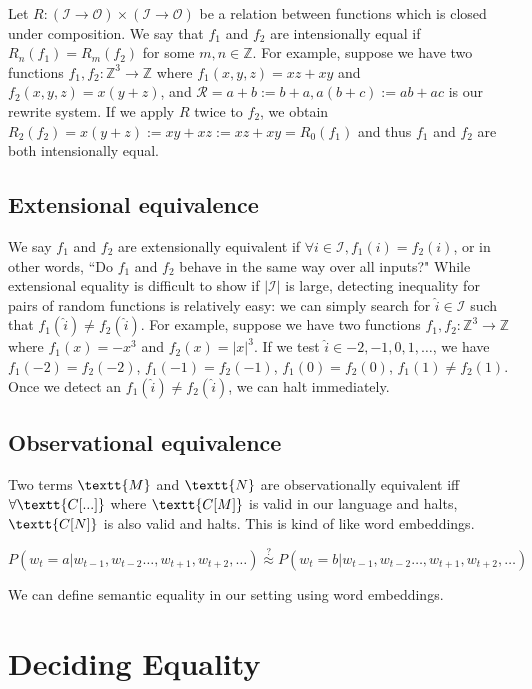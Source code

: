 \documentclass[11pt]{article}
\begin{document}
    Let $R: (\mathcal{I} \rightarrow \mathcal{O}) \times (\mathcal{I}\rightarrow \mathcal{O})$ be a relation between functions which is closed under composition. We say that $f_1$ and $f_2$ are intensionally equal if $R_n(f_1)=R_m(f_2)$ for some $m,n \in \mathbb{Z}$. For example, suppose we have two functions $f_1, f_2: \mathbb{Z}^3 \rightarrow \mathbb{Z}$ where $f_1(x, y, z)=xz + xy$ and $f_2(x, y, z)=x(y + z)$, and $\mathcal{R}={a + b := b + a, a(b + c) := ab + ac}$ is our rewrite system. If we apply $R$ twice to $f_2$, we obtain $R_2(f_2)=x(y + z):=xy + xz:=xz + xy=R_0(f_1)$ and thus $f_1$ and $f_2$ are both intensionally equal.

    \subsection{Extensional equivalence}\label{subsec:extensional-equivalence}

    We say $f_1$ and $f_2$ are extensionally equivalent if $\forall i \in \mathcal{I}, f_1(i)=f_2(i)$, or in other words, ``Do $f_1$ and $f_2$ behave in the same way over all inputs?" While extensional equality is difficult to show if $|\mathcal{I}|$ is large, detecting inequality for pairs of random functions is relatively easy: we can simply search for $\hat i \in \mathcal{I}$ such that $f_1(\hat i) \neq f_2(\hat i)$. For example, suppose we have two functions $f_1, f_2: \mathbb{Z}^3 \rightarrow \mathbb{Z}$ where $f_1(x)=-x^3$ and $f_2(x)=|x|^3$. If we test $\hat i \in {-2, -1, 0, 1, \ldots}$, we have $f_1(-2)=f_2(-2)$, $f_1(-1)=f_2(-1)$, $f_1(0)=f_2(0)$, $f_1(1) \neq f_2(1)$. Once we detect an $f_1(\hat i) \neq f_2(\hat i)$, we can halt immediately.

    \subsection{Observational equivalence}

    Two terms $\textt{M}$ and $\textt{N}$ are observationally equivalent iff $\forall \textt{C[...]}$ where $\textt{C[M]}$ is valid in our language and halts, $\textt{C[N]}$ is also valid and halts. This is kind of like word embeddings.

    $P(w_t = a | w_{t-1}, w_{t-2}\ldots, w_{t+1}, w_{t+2}, \ldots)\overset{?}{\approx} P(w_t = b | w_{t-1}, w_{t-2}\ldots, w_{t+1}, w_{t+2}, \ldots)$

    We can define semantic equality in our setting using word embeddings.

    \section{Deciding Equality}\label{sec:algorithms}
\end{document}

